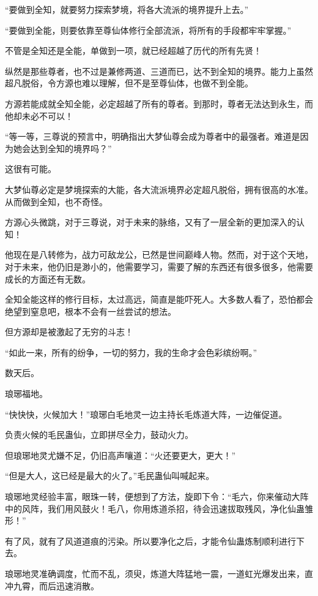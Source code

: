\begin{this_body}
“要做到全知，就要努力探索梦境，将各大流派的境界提升上去。”

“要做到全能，则要依靠至尊仙体修行全部流派，将所有的手段都牢牢掌握。”

不管是全知还是全能，单做到一项，就已经超越了历代的所有先贤！

纵然是那些尊者，也不过是兼修两道、三道而已，达不到全知的境界。能力上虽然超凡脱俗，令方源也难以理解，但不是至尊仙体，也做不到全能。

方源若能成就全知全能，必定超越了所有的尊者。到那时，尊者无法达到永生，而他却未必不可以！

“等一等，三尊说的预言中，明确指出大梦仙尊会成为尊者中的最强者。难道是因为她会达到全知的境界吗？”

这很有可能。

大梦仙尊必定是梦境探索的大能，各大流派境界必定超凡脱俗，拥有很高的水准。从而做到全知，也不奇怪。

方源心头微跳，对于三尊说，对于未来的脉络，又有了一层全新的更加深入的认知！

他现在是八转修为，战力可敌龙公，已然是世间巅峰人物。然而，对于这个天地，对于未来，他仍旧是渺小的，他需要学习，需要了解的东西还有很多很多，他需要成长的方面还有无数。

全知全能这样的修行目标，太过高远，简直是能吓死人。大多数人看了，恐怕都会绝望到窒息吧，根本不会有一丝尝试的想法。

但方源却是被激起了无穷的斗志！

“如此一来，所有的纷争，一切的努力，我的生命才会色彩缤纷啊。”

数天后。

琅琊福地。

“快快快，火候加大！”琅琊白毛地灵一边主持长毛炼道大阵，一边催促道。

负责火候的毛民蛊仙，立即拼尽全力，鼓动火力。

但琅琊地灵尤嫌不足，仍旧高声嚷道：“火还要更大，更大！”

“但是大人，这已经是最大的火了。”毛民蛊仙叫喊起来。

琅琊地灵经验丰富，眼珠一转，便想到了方法，旋即下令：“毛六，你来催动大阵中的风阵，我们用风鼓火！毛八，你用炼道杀招，待会迅速拔取残风，净化仙蛊雏形！”

有了风，就有了风道道痕的污染。所以要净化之后，才能令仙蛊炼制顺利进行下去。

琅琊地灵准确调度，忙而不乱，须臾，炼道大阵猛地一震，一道虹光爆发出来，直冲九霄，而后迅速消散。


\end{this_body}
